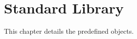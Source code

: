 
\chapter{\us Standard Library}
\label{sec:stdlib}

This chapter details the predefined objects.

\ifx\ifHtml\undefined\else
\section*{}
\fi

